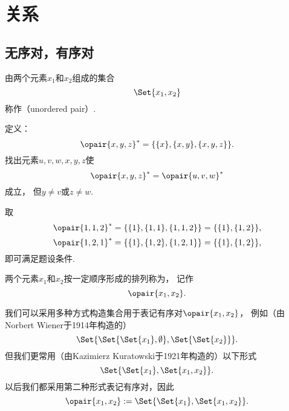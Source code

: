 \section{关系}
\subsection{无序对，有序对}
\begin{definition}
由两个元素\(x_1\)和\(x_2\)组成的集合\begin{equation*}
\Set{x_1, x_2}
\end{equation*}称作（unordered pair）.
\end{definition}

\begin{example}
定义：\begin{equation*}
	\opair{x,y,z}^* = \{\{x\},\{x,y\},\{x,y,z\}\}.
\end{equation*}
找出元素\(u,v,w,x,y,z\)使\begin{equation*}
	\opair{x,y,z}^* = \opair{u,v,w}^*
\end{equation*}成立，
但\(y \neq v\)或\(z \neq w\).
\begin{solution}
取\begin{equation*}
	\opair{1,1,2}^* = \{\{1\},\{1,1\},\{1,1,2\}\} = \{\{1\},\{1,2\}\},
\end{equation*}\begin{equation*}
	\opair{1,2,1}^* = \{\{1\},\{1,2\},\{1,2,1\}\} = \{\{1\},\{1,2\}\},
\end{equation*}
即可满足题设条件.
\end{solution}
\end{example}

\begin{definition}
两个元素\(x_1\)和\(x_2\)按一定顺序形成的排列称为，
记作\begin{equation*}
	\opair{x_1,x_2}.
\end{equation*}

我们可以采用多种方式构造集合用于表记有序对\(\opair{x_1,x_2}\)，
例如（由Norbert Wiener于1914年构造的）
\begin{equation*}
	\Set{ \Set{ \Set{x_1}, \emptyset }, \Set{ \Set{ x_2 } } }.
\end{equation*}
但我们更常用（由Kazimierz Kuratowski于1921年构造的）以下形式
\begin{equation*}
	\Set{ \Set{x_1}, \Set{x_1, x_2} }.
\end{equation*}
以后我们都采用第二种形式表记有序对，因此\begin{equation*}
	\opair{x_1,x_2}
	\defeq
	\Set{ \Set{x_1}, \Set{x_1, x_2} }.
\end{equation*}
\end{definition}


